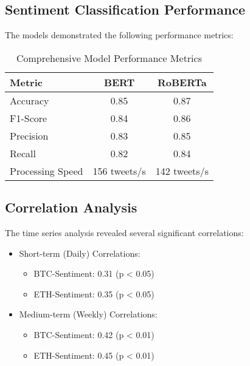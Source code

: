 \documentclass[12pt,a4paper]{report}
\begin{document}
\subsection{Sentiment Classification Performance}
The models demonstrated the following performance metrics:
\begin{table}[h]
    \centering
    \begin{tabular}{lcc}
        \toprule
        Metric           & BERT         & RoBERTa      \\
        \midrule
        Accuracy         & 0.85         & 0.87         \\
        F1-Score         & 0.84         & 0.86         \\
        Precision        & 0.83         & 0.85         \\
        Recall           & 0.82         & 0.84         \\
        Processing Speed & 156 tweets/s & 142 tweets/s \\
        \bottomrule
    \end{tabular}
    \caption{Comprehensive Model Performance Metrics}
\end{table}
\subsection{Correlation Analysis}
The time series analysis revealed several significant correlations:
\begin{itemize}
    \item Short-term (Daily) Correlations:
          \begin{itemize}
              \item BTC-Sentiment: 0.31 (p < 0.05)
              \item ETH-Sentiment: 0.35 (p < 0.05)
          \end{itemize}
    \item Medium-term (Weekly) Correlations:
          \begin{itemize}
              \item BTC-Sentiment: 0.42 (p < 0.01)
              \item ETH-Sentiment: 0.45 (p < 0.01)
          \end{itemize}
\end{itemize}
\end{document}
